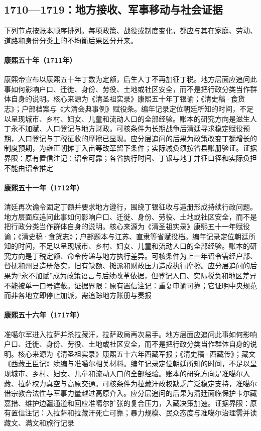 \subsection{1710—1719：地方接收、军事移动与社会证据}
下列节点按账本顺序排列。每项政策、战役或制度变化，都应与其在家庭、劳动、道路和身份分类上的不均衡后果区分开来。
\hypertarget{social:EQ-1711-TAX-FREEZE}{}\paragraph{康熙五十年（1711年）}康熙帝宣布以康熙五十年丁数为定额，后生人丁不再加征丁税。地方层面应追问此事如何影响户口、迁徙、身份、劳役、土地或社区安全，而不是把行政分类当作群体自身的说明。核心来源为《清圣祖实录》康熙五十年丁银谕；《清史稿·食货志》；户部档案与《大清会典事例》赋役条。编年记录定位朝廷所知的时间，不足以呈现城市、乡村、妇女、儿童和流动人口的全部经验。账本的研究方向是滋生人丁永不加赋、人口登记与地方财政。可核条件为长期战争后清廷寻求稳定赋役预期，人口登记与丁税征收的摩擦已显现。应分层追问的后果为政策改变丁额增长的制度预期，为雍正朝摊丁入亩等改革留下条件；实际减负须按省县账册验证。证据界限：原有置信注记：诏令可靠；各省执行时间、丁银与地丁并征口径和实际负担不能由诏令推定
\hypertarget{social:EQ-1712-TAX-EDICT}{}\paragraph{康熙五十一年（1712年）}清廷再次谕令固定丁额并要求地方遵行，围绕丁银征收与造册形成持续行政问题。地方层面应追问此事如何影响户口、迁徙、身份、劳役、土地或社区安全，而不是把行政分类当作群体自身的说明。核心来源为《清圣祖实录》康熙五十一年赋役谕；《清史稿·食货志》；户部题本与江苏、直隶等省赋役档。编年记录定位朝廷所知的时间，不足以呈现城市、乡村、妇女、儿童和流动人口的全部经验。账本的研究方向是丁税定额、命令传递与地方执行差异。可核条件为上一年诏令需经户部、督抚和州县造册落实，旧有缺额、摊派和财政压力造成执行摩擦。应分层追问的后果为“永不加赋”成为政策语言与后续改革依据，但登记人口、实际税负和地区差异不能被单一口号遮蔽。证据界限：原有置信注记：重复申谕可靠；它证明中央规范而非各地立即停止加派，需追踪地方账册与奏报
\hypertarget{social:EQ-1717-DZUNGAR-LHASA}{}\paragraph{康熙五十六年（1717年）}准噶尔军进入拉萨并杀拉藏汗，拉萨政局再次易手。地方层面应追问此事如何影响户口、迁徙、身份、劳役、土地或社区安全，而不是把行政分类当作群体自身的说明。核心来源为《清圣祖实录》康熙五十六年西藏军报；《清史稿·西藏传》；藏文《西藏王臣记》续编与准噶尔相关材料。编年记录定位朝廷所知的时间，不足以呈现城市、乡村、妇女、儿童和流动人口的全部经验。账本的研究方向是准噶尔入藏、拉萨权力真空与高原交通。可核条件为拉藏汗政权缺乏广泛稳定支持，准噶尔借宗教合法性与军事力量越过高原介入。应分层追问的后果为清廷面临保护卡尔藏嘉措、维护边疆通道和回应准噶尔扩张的复合压力，入藏决策加速。证据界限：原有置信注记：入拉萨和拉藏汗死亡可靠；暴力规模、民众态度与准噶尔治理需并读藏文、满文和旅行记录
